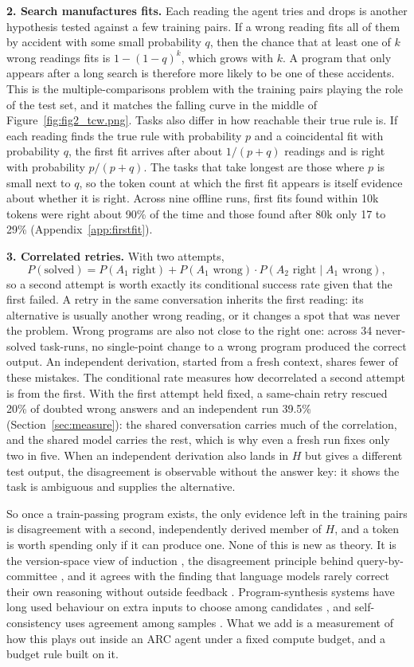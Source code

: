 \documentclass[11pt]{article}
\begin{document}
\textbf{2. Search manufactures fits.} Each reading the agent tries and drops is another hypothesis tested against a few training pairs. If a wrong reading fits all of them by accident with some small probability $q$, then the chance that at least one of $k$ wrong readings fits is $1-(1-q)^k$, which grows with $k$. A program that only appears after a long search is therefore more likely to be one of these accidents. This is the multiple-comparisons problem with the training pairs playing the role of the test set, and it matches the falling curve in the middle of Figure~\ref{fig:fig2_tcw.png}. Tasks also differ in how reachable their true rule is. If each reading finds the true rule with probability $p$ and a coincidental fit with probability $q$, the first fit arrives after about $1/(p+q)$ readings and is right with probability $p/(p+q)$. The tasks that take longest are those where $p$ is small next to $q$, so the token count at which the first fit appears is itself evidence about whether it is right. Across nine offline runs, first fits found within 10k tokens were right about 90\% of the time and those found after 80k only 17 to 29\% (Appendix~\ref{app:firstfit}).

\textbf{3. Correlated retries.} With two attempts,
\[ P(\text{solved}) = P(A_1 \text{ right}) + P(A_1 \text{ wrong})\cdot P(A_2 \text{ right} \mid A_1 \text{ wrong}), \]
so a second attempt is worth exactly its conditional success rate given that the first failed. A retry in the same conversation inherits the first reading: its alternative is usually another wrong reading, or it changes a spot that was never the problem. Wrong programs are also not close to the right one: across 34 never-solved task-runs, no single-point change to a wrong program produced the correct output. An independent derivation, started from a fresh context, shares fewer of these mistakes. The conditional rate measures how decorrelated a second attempt is from the first. With the first attempt held fixed, a same-chain retry rescued 20\% of doubted wrong answers and an independent run 39.5\% (Section~\ref{sec:measure}): the shared conversation carries much of the correlation, and the shared model carries the rest, which is why even a fresh run fixes only two in five. When an independent derivation also lands in $H$ but gives a different test output, the disagreement is observable without the answer key: it shows the task is ambiguous and supplies the alternative.

So once a train-passing program exists, the only evidence left in the training pairs is disagreement with a second, independently derived member of $H$, and a token is worth spending only if it can produce one. None of this is new as theory. It is the version-space view of induction \cite{mitchell1982}, the disagreement principle behind query-by-committee \cite{seung1992}, and it agrees with the finding that language models rarely correct their own reasoning without outside feedback \cite{huang2024}. Program-synthesis systems have long used behaviour on extra inputs to choose among candidates \cite{alphacode,codet}, and self-consistency uses agreement among samples \cite{selfconsistency}. What we add is a measurement of how this plays out inside an ARC agent under a fixed compute budget, and a budget rule built on it.
\end{document}
